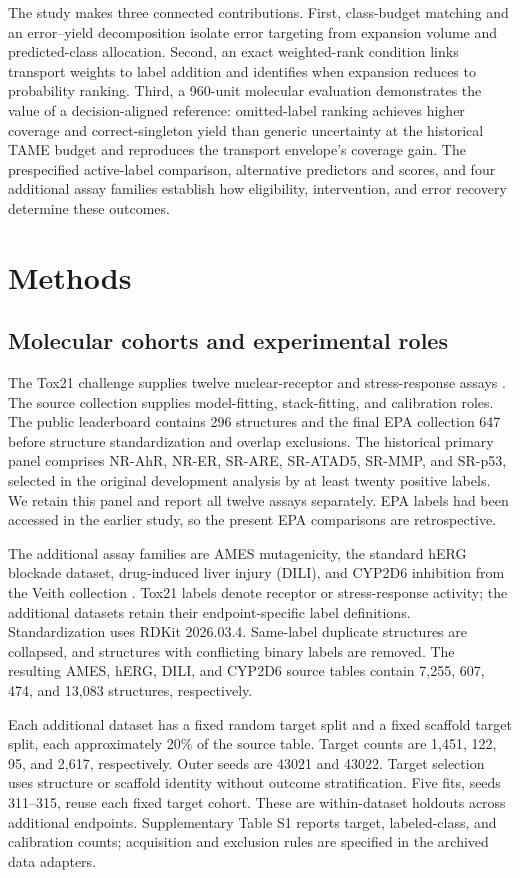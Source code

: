 The study makes three connected contributions. First, class-budget matching and an error--yield decomposition isolate error targeting from expansion volume and predicted-class allocation. Second, an exact weighted-rank condition links transport weights to label addition and identifies when expansion reduces to probability ranking. Third, a 960-unit molecular evaluation demonstrates the value of a decision-aligned reference: omitted-label ranking achieves higher coverage and correct-singleton yield than generic uncertainty at the historical TAME budget and reproduces the transport envelope's coverage gain. The prespecified active-label comparison, alternative predictors and scores, and four additional assay families establish how eligibility, intervention, and error recovery determine these outcomes.

\section{Methods}
\subsection{Molecular cohorts and experimental roles}
The Tox21 challenge supplies twelve nuclear-receptor and stress-response assays \citep{huang2016}. The source collection supplies model-fitting, stack-fitting, and calibration roles. The public leaderboard contains 296 structures and the final EPA collection 647 before structure standardization and overlap exclusions. The historical primary panel comprises NR-AhR, NR-ER, SR-ARE, SR-ATAD5, SR-MMP, and SR-p53, selected in the original development analysis by at least twenty positive labels. We retain this panel and report all twelve assays separately. EPA labels had been accessed in the earlier study, so the present EPA comparisons are retrospective.

The additional assay families are AMES mutagenicity, the standard hERG blockade dataset, drug-induced liver injury (DILI), and CYP2D6 inhibition from the Veith collection \citep{ames2012,herg2016,dili2015,veith2009}. Tox21 labels denote receptor or stress-response activity; the additional datasets retain their endpoint-specific label definitions. Standardization uses RDKit 2026.03.4. Same-label duplicate structures are collapsed, and structures with conflicting binary labels are removed. The resulting AMES, hERG, DILI, and CYP2D6 source tables contain 7,255, 607, 474, and 13,083 structures, respectively.

Each additional dataset has a fixed random target split and a fixed scaffold target split, each approximately 20\% of the source table. Target counts are 1,451, 122, 95, and 2,617, respectively. Outer seeds are 43021 and 43022. Target selection uses structure or scaffold identity without outcome stratification. Five fits, seeds 311--315, reuse each fixed target cohort. These are within-dataset holdouts across additional endpoints. Supplementary Table S1 reports target, labeled-class, and calibration counts; acquisition and exclusion rules are specified in the archived data adapters.

